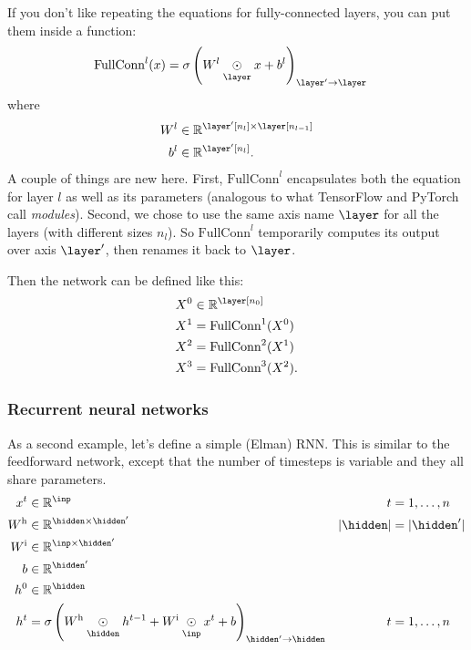 \documentclass{article}
\begin{document}
If you don't like repeating the equations for fully-connected layers, you can put them inside a function:
\begin{align*}
  \text{FullConn}^l(x) &= \sigma\left(W^l \ndot{\layer} x + b^l\right)_{\layer'\rightarrow\layer}
\end{align*}
where
\begin{align*}
  W^l &\in \mathbb{R}^{\layer'[n_l] \times \layer[n_{l-1}]} \\
  b^l &\in \mathbb{R}^{\layer'[n_l]}.
\end{align*}
A couple of things are new here. First, $\text{FullConn}^l$ encapsulates both the equation for layer $l$ as well as its parameters (analogous to what TensorFlow and PyTorch call \emph{modules}). Second, we chose to use the same axis name $\layer$ for all the layers (with different sizes $n_l$). So $\text{FullConn}^l$ temporarily computes its output over axis $\layer'$, then renames it back to $\layer$. 

Then the network can be defined like this:
\begin{align*}
  X^0 &\in \mathbb{R}^{\layer[n_0]} \\
  X^1 &= \text{FullConn}^1(X^0) \\
  X^2 &= \text{FullConn}^2(X^1) \\
  X^3 &= \text{FullConn}^3(X^2).
\end{align*}

\subsubsection{Recurrent neural networks}
\label{sec:rnn}

As a second example, let's define a simple (Elman) RNN. This is similar to the feedforward network, except that the number of timesteps is variable and they all share parameters.
\begin{align*}
x^{t} &\in \mathbb{R}^{\inp} & t &= 1, \ldots, n \\
W^{\text{h}} &\in \mathbb{R}^{\hidden \times \hidden'} & |\hidden| &= |\hidden'| \\
W^{\text{i}} &\in \mathbb{R}^{\inp \times \hidden'} \\
b &\in \mathbb{R}^{\hidden'} \\
h^{0} &\in \mathbb{R}^{\hidden} \\
h^{t} &= \sigma\left( W^{\text{h}} \ndot{\hidden} h^{t-1} + W^{\text{i}} \ndot{\inp} x^{t} + b \right)_{\hidden'\rightarrow\hidden} & t &= 1, \ldots, n
\end{align*}
\end{document}

